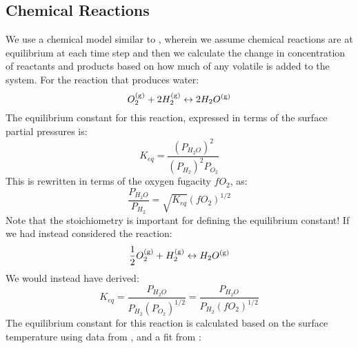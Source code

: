 \subsection{Chemical Reactions}
We use a chemical model similar to \cite{GS14}, wherein we assume chemical reactions are at equilibrium at each time step and then we calculate the change in concentration of reactants and products based on how much of any volatile is added to the system.  For the reaction that produces water: 
\begin{equation}
    O_2^{\rm (g)} + 2H_2^{\rm (g)} \leftrightarrow 2H_2O^{\rm (g)}
\end{equation}
The equilibrium constant for this reaction, expressed in terms of the surface partial pressures is:
\begin{equation}
    K_{eq} = \frac{(P_{H_2O})^2}{\left(P_{H_2}\right)^2 P_{O_2}}
\end{equation}
This is rewritten in terms of the oxygen fugacity $fO_2$, as: 
\begin{equation}
    \frac{P_{H_2O}}{P_{H_2}} = \sqrt{K_{eq}} \left(fO_2\right)^{1/2}
\end{equation}
Note that the stoichiometry is important for defining the equilibrium constant!  If we had instead considered the reaction:
\begin{equation}
    \frac{1}{2} O_2^{\rm (g)} + H_2^{\rm (g)} \leftrightarrow H_2O^{\rm (g)}
\end{equation}
We would instead have derived:
\begin{equation}
     K_{eq} = \frac{P_{H_2O}}{P_{H_2} \left(P_{O_2}\right)^{1/2}} = \frac{P_{H_2O}}{P_{H_2} \left(fO_2\right)^{1/2}}
    \label{eq:Keq}    
\end{equation}
The equilibrium constant for this reaction is calculated based on the surface temperature using data from \cite{RBF78}, and a fit from \cite{OS19}:  
